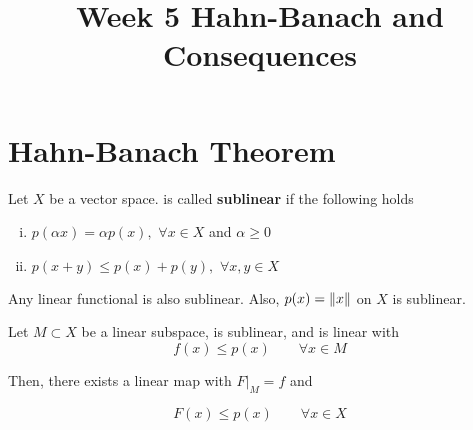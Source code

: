 \documentclass{article}
\title{Week 5 Hahn-Banach and Consequences}
\begin{document}
\maketitle

\section{Hahn-Banach Theorem} 

\begin{definition}\nl
\label{sublinear map}
	Let $X$ be a vector space.  is called \textbf{sublinear} if the following holds
	\begin{enumerate}[i)]
		\item $p( \alpha x)= \alpha p(x),$ $\forall x\in X$ and $\alpha\geq0$
		\item $p(x+y) \leq p(x)+p(y),\,\,\forall x,y\in X$
	\end{enumerate}
\end{definition}

\begin{example}
    Any linear functional is also sublinear. Also, $p(x)=\left\|{x}\right\|$ on $X$ is sublinear.
\end{example}  

\begin{theorem}\nl
\label{Hahn-Banach}
	Let $M\subset X$ be a linear subspace,  is sublinear, and  is linear with 
	\begin{equation*}
	    f(x)\leq p(x) \qquad \forall x\in M
     \tag{$*$}
	\end{equation*}

	Then, there exists a linear map  with $F|_M=f$ and
	
	$$F(x)\leq p(x) \qquad \forall x\in X$$
\end{theorem}
\end{document}
